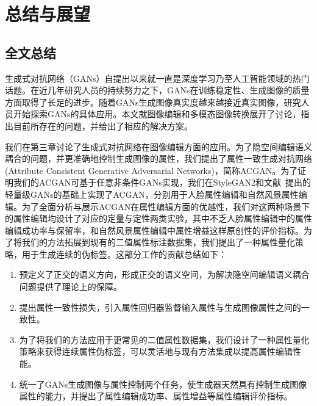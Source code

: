 \chapter{总结与展望}

\section{全文总结}

生成式对抗网络（GANs）自提出以来就一直是深度学习乃至人工智能领域的热门话题。在近几年研究人员的持续努力之下，GANs在训练稳定性、生成图像的质量方面取得了长足的进步。随着GANs生成图像真实度越来越接近真实图像，研究人员开始探索GANs的具体应用。本文就图像编辑和多模态图像转换展开了讨论，指出目前所存在的问题，并给出了相应的解决方案。

我们在第三章讨论了生成式对抗网络在图像编辑方面的应用。为了隐空间编辑语义耦合的问题，并更准确地控制生成图像的属性，我们提出了属性一致生成对抗网络(Attribute Consistent Generative Adversarial Networks)，简称ACGAN。为了证明我们的ACGAN可基于任意非条件GANs实现，我们在StyleGAN2和文献~\cite{lwgan}提出的轻量级GANs的基础上实现了ACGAN，分别用于人脸属性编辑和自然风景属性编辑。为了全面分析与展示ACGAN在属性编辑方面的优越性，我们对这两种场景下的属性编辑均设计了对应的定量与定性两类实验，其中不乏人脸属性编辑中的属性编辑成功率与保留率，和自然风景属性编辑中属性增益这样原创性的评价指标。为了将我们的方法拓展到现有的二值属性标注数据集，我们提出了一种属性量化策略，用于生成连续的伪标签。这部分工作的贡献总结如下：
\begin{enumerate}
    \item 预定义了正交的语义方向，形成正交的语义空间，为解决隐空间编辑语义耦合问题提供了理论上的保障。
    \item 提出属性一致性损失，引入属性回归器监督输入属性与生成图像属性之间的一致性。
    \item 为了将我们的方法应用于更常见的二值属性数据集，我们设计了一种属性量化策略来获得连续属性伪标签，可以灵活地与现有方法集成以提高属性编辑性能。
    \item 统一了GANs生成图像与属性控制两个任务，使生成器天然具有控制生成图像属性的能力，并提出了属性编辑成功率、属性增益等属性编辑评价指标。
\end{enumerate}

